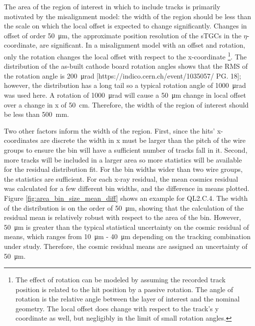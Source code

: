 The area of the region of interest in which to include tracks is primarily motivated by the misalignment model: the width of the region should be less than the scale on which the local offset is expected to change significantly. Changes in offset of order \SI{50}{\micro\meter}, the approximate position resolution of the sTGCs in the $\eta$-coordinate, are significant. In a misalignment model with an offset and rotation, only the rotation changes the local offset with respect to the x-coordinate \footnote{The effect of rotation can be modeled by assuming the recorded track position is related to the hit position by a passive rotation. The angle of rotation is the relative angle between the layer of interest and the nominal geometry. The local offset does change with respect to the track's y coordinate as well, but negligibly in the limit of small rotation angles.}.  The distribution of the as-built cathode board rotation angles shows that the RMS of the rotation angle is \SI{200}{\micro\radian} [https://indico.cern.ch/event/1035057/ PG. 18]; however, the distribution has a long tail so a typical rotation angle of \SI{1000}{\micro\radian} was used here. A rotation of \SI{1000}{\micro\radian} will cause a \SI{50}{\micro\meter} change in local offset over a change in x of \SI{50}{\centi\meter}. Therefore, the width of the region of interest should be less than \SI{500}{\milli\meter}.

Two other factors inform the width of the region. First, since the hits' x-coordinates are discrete the width in x must be larger than the pitch of the wire groups to ensure the bin will have a sufficient number of tracks fall in it. Second, more tracks will be included in a larger area so more statistics will be available for the residual distribution fit. For the bin widths wider than two wire groups, the statistics are sufficient. For each x-ray residual, the mean cosmics residual was calculated for a few different bin widths, and the difference in means plotted. Figure \ref{fig:area_bin_size_mean_diff} shows an example for QL2.C.4. The width of the distribution is on the order of \SI{50}{\micro\meter}, showing that the calculation of the residual mean is relatively robust with respect to the area of the bin. However, \SI{50}{\micro\meter} is greater than the typical statistical uncertainty on the cosmic residual of means, which ranges from \SI{10}{\micro\meter} - \SI{40}{\micro\meter} depending on the tracking combination under study. Therefore, the cosmic residual means are assigned an uncertainty of \SI{50}{\micro\meter}.

